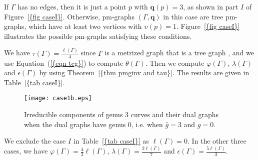 \documentclass[12pt]{amsart}
\theoremstyle{example}
\theoremstyle{definition}
\theoremstyle{notation}
\begin{document}
If ${\Gamma}$ has no edges, then it is just a point $p$ with ${\textbf{q}} (p)=3$, as shown in part $I$ of {Figure~\ref{{fig caseI}}}. Otherwise, pm-graphs $({\Gamma},{\textbf{q}})$ in this case are tree pm-graphs, which have at least two vertices with ${\upsilon}(p)=1$. {Figure~\ref{{fig caseI}}} illustrates the possible pm-graphs satisfying these conditions.

We have ${\tau(\Gamma)}=\frac{\ell ({\Gamma})}{4}$ since ${\Gamma}$ is a metrized graph that is a tree graph \cite[Equation 14.3]{BRh}, and we use {Equation~(\ref{{eqn tcg}})} to compute ${\theta ({\Gamma})}$. Then we compute ${\varphi ({\Gamma})}$, ${\lambda ({\Gamma})}$ and ${\epsilon({\Gamma})}$ by using {Theorem~\ref{{thm pmginv and tau}}}. The results are given in {Table~\ref{{tab caseI}}}.
\begin{figure}
\centering
\texttt{[image: case1b.eps]}  \caption{Irreducible components of genus 3 curves and their dual graphs when the dual graphs have genus $0$, i.e. when ${\bar{g}}=3$ and $g=0$.} \label{fig caseI}
\end{figure}

\begin{table}
\begin{center}
\end{center}  \caption{Pm-graph invariants when $g({\Gamma})=0$} \label{tab caseI}
\end{table}
We exclude the case $I$ in {Table~\ref{{tab caseI}}} as ${\ell ({\Gamma})} =0$. In the other three cases, we have  ${\varphi ({\Gamma})} = \frac{4}{3} {\ell ({\Gamma})}$, ${\lambda ({\Gamma})}=\frac{2{\ell ({\Gamma})}}{7}$ and ${\epsilon({\Gamma})}=\frac{5{\ell ({\Gamma})}}{3}$.
\end{document}
